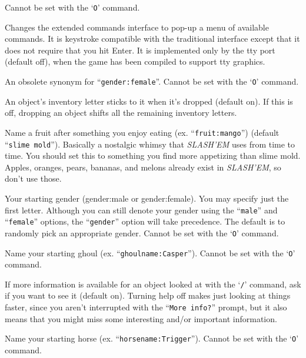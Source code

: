 Cannot be set with the `{\tt O}' command.

\item[\ib{extmenu}]
Changes the extended commands interface to pop-up a menu of available commands.  
It is keystroke compatible with the traditional interface except that it does
not require that you hit Enter. It is implemented only by the tty port 
(default off), when the game has been compiled to support tty graphics.

\item[\ib{female}]
An obsolete synonym for ``{\tt gender:female}''.
Cannot be set with the `{\tt O}' command.

\item[\ib{fixinv}]
An object's inventory letter sticks to it when it's dropped (default on).
If this is off, dropping an object shifts all the remaining inventory letters.

\item[\ib{fruit}]
Name a fruit after something you enjoy eating (ex. ``{\tt fruit:mango}'')
(default ``{\tt slime mold}'').  Basically a nostalgic whimsy that {\it SLASH'EM\/} uses
from time to time.  You should set this to something you find more
appetizing than slime mold.  Apples, oranges, pears, bananas, and melons
already exist in {\it SLASH'EM}, so don't use those.

\item[\ib{gender}]
Your starting gender (gender:male or gender:female).
You may specify just the first letter.  Although you can
still denote your gender using the ``{\tt male}'' and ``{\tt female}''
options, the ``{\tt gender}'' option will take precedence.
The default is to randomly pick an appropriate gender.
Cannot be set with the `{\tt O}' command.

\item[\ib{ghoulname}]
Name your starting ghoul (ex. ``{\tt ghoulname:Casper}'').
Cannot be set with the `{\tt O}' command.

\item[\ib{help}]
If more information is available for an object looked at
with the `{\tt /}' command, ask if you want to see it (default on). Turning help
off makes just looking at things faster, since you aren't interrupted with the
``{\tt More info?}'' prompt, but it also means that you might miss some
interesting and/or important information.

\item[\ib{horsename}]
Name your starting horse (ex. ``{\tt horsename:Trigger}'').
Cannot be set with the `{\tt O}' command.

